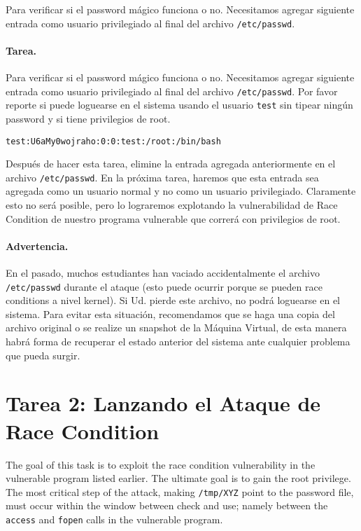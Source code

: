 Para verificar si el password mágico funciona o no. Necesitamos agregar siguiente  entrada como usuario privilegiado al final del archivo \texttt{/etc/passwd}.
\paragraph{Tarea.} Para verificar si el password mágico funciona o no. Necesitamos agregar siguiente  entrada como usuario privilegiado al final del archivo \texttt{/etc/passwd}.
Por favor reporte si puede loguearse en el sistema usando el usuario  \texttt{test} sin tipear ningún password y si tiene privilegios de root.

\begin{lstlisting}
test:U6aMy0wojraho:0:0:test:/root:/bin/bash
\end{lstlisting}

Después de hacer esta tarea, elimine la entrada agregada anteriormente en el archivo \texttt{/etc/passwd}. En la próxima tarea, haremos que esta entrada sea agregada como un usuario normal y no como un usuario privilegiado. Claramente esto no será posible, pero lo lograremos explotando la vulnerabilidad de Race Condition de nuestro programa vulnerable que correrá con privilegios de root.


\paragraph{Advertencia.}
En el pasado, muchos estudiantes han vaciado accidentalmente el archivo {\tt /etc/passwd} durante el ataque (esto puede ocurrir porque se pueden race conditions a nivel kernel). Si Ud. pierde este archivo, no podrá loguearse en el sistema. Para evitar esta situación, recomendamos que se haga una copia del archivo original o se realize un snapshot de la Máquina Virtual, de esta manera habrá forma de recuperar el estado anterior del sistema ante cualquier problema que pueda surgir.



\section{Tarea 2: Lanzando el Ataque de Race Condition}

The goal of this task is to exploit the race condition vulnerability in 
the vulnerable \setuid program listed earlier. The ultimate goal is to gain
the root privilege.  The most critical step of the attack,  making
\texttt{/tmp/XYZ} point to the password file, must occur within
the window between check and use; namely between the \texttt{access} 
and \texttt{fopen} calls in the vulnerable program. 

